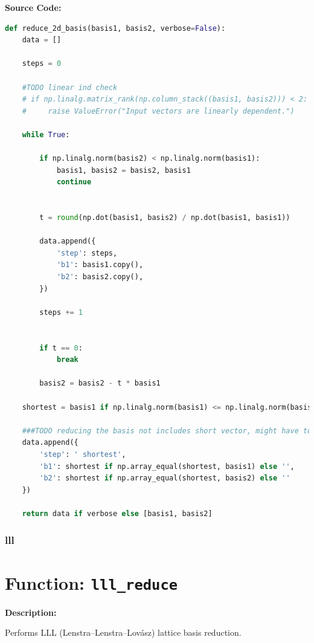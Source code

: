 \documentclass[a4paper,12pt]{article}
\begin{document}
\textbf{Source Code:}

\begin{lstlisting}[language=Python]
def reduce_2d_basis(basis1, basis2, verbose=False):
    data = []

    steps = 0

    #TODO linear ind check
    # if np.linalg.matrix_rank(np.column_stack((basis1, basis2))) < 2:
    #     raise ValueError("Input vectors are linearly dependent.")

    while True:

        if np.linalg.norm(basis2) < np.linalg.norm(basis1):
            basis1, basis2 = basis2, basis1
            continue


        t = round(np.dot(basis1, basis2) / np.dot(basis1, basis1))

        data.append({
            'step': steps,
            'b1': basis1.copy(),
            'b2': basis2.copy(),
        })

        steps += 1


        if t == 0:
            break

        basis2 = basis2 - t * basis1

    shortest = basis1 if np.linalg.norm(basis1) <= np.linalg.norm(basis2) else basis2

    ###TODO reducing the basis not includes short vector, might have to remove
    data.append({
        'step': ' shortest',
        'b1': shortest if np.array_equal(shortest, basis1) else '',
        'b2': shortest if np.array_equal(shortest, basis2) else ''
    })

    return data if verbose else [basis1, basis2]
\end{lstlisting}






\subsubsection{lll}

\section*{Function: \texttt{lll\_reduce}}

\textbf{Description:}

Performs LLL (Lenstra–Lenstra–Lovász) lattice basis reduction.
\end{document}
